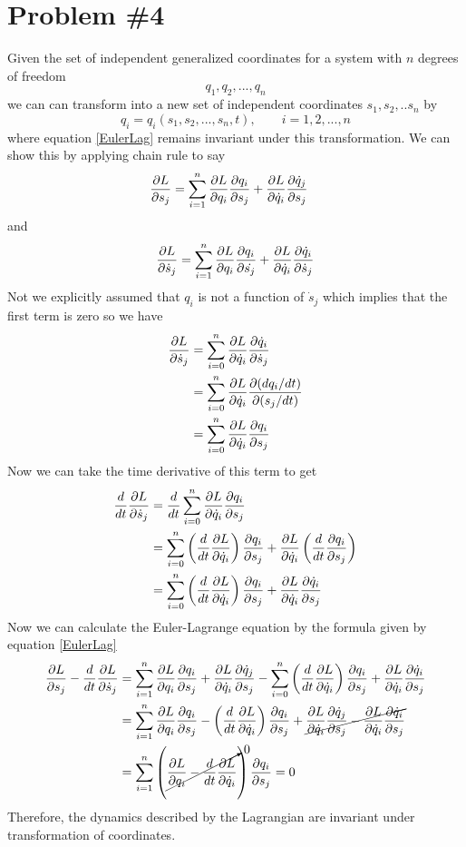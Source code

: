 \documentclass[11pt]{article}
\numberwithin{equation}{section}
\begin{document}
\pagebreak

\section{Problem \#4}
Given the set of independent generalized coordinates for a system with $n$ degrees of freedom
$$q_1,q_2,...,q_n$$
we can can transform into a new set of independent coordinates $s_1,s_2,..s_n$ by
$$q_i = q_i(s_1,s_2,...,s_n,t),\qquad i=1,2,...,n$$ 
where equation \ref{EulerLag} remains invariant under this transformation. We can show this
by applying chain rule to say
\begin{align*}
\frac{\partial{L}}{\partial{s_j}} &= \sum_{i=1}^{n}\frac{\partial{L}}{\partial{q_i}}\frac{\partial{q_i}}{\partial{s_j}}+\frac{\partial{L}}{\partial{\dot{q}_i}}\frac{\partial{\dot{q}_j}}{\partial{s_j}}
\end{align*}
and
$$\frac{\partial{L}}{\partial{\dot{s}_j}} = \sum_{i=1}^{n}\frac{\partial{L}}{\partial{q_i}}\frac{\partial{q_i}}{\partial{\dot{s_j}}} + \frac{\partial{L}}{\partial{\dot{q}_i}}\frac{\partial{\dot{q}_i}}{\partial{\dot{s}_j}}$$
Not we explicitly assumed that $q_i$ is not a function of $\dot{s}_j$ which implies that the 
first term is zero so we have
\begin{align*}
\frac{\partial{L}}{\partial{\dot{s}_j}} &= \sum_{i=0}^{n}\frac{\partial{L}}{\partial{\dot{q}_i}}\frac{\partial{\dot{q}_i}}{\partial{\dot{s}_j}}\\
&= \sum_{i=0}^{n}\frac{\partial{L}}{\partial{\dot{q}_i}}\frac{\partial{(dq_i/dt)}}{\partial{(s_j/dt)}}\\
&= \sum_{i=0}^{n}\frac{\partial{L}}{\partial{\dot{q}_i}}\frac{\partial{q_i}}{\partial{s_j}}
\end{align*}
Now we can take the time derivative of this term to get
\begin{align*}
\frac{d}{dt}\frac{\partial{L}}{\partial{\dot{s}_j}} &= \frac{d}{dt}\sum_{i=0}^{n}\frac{\partial{L}}{\partial{\dot{q}_i}}\frac{\partial{q_i}}{\partial{s_j}}\\
&= \sum_{i=0}^{n}\left(\frac{d}{dt}\frac{\partial{L}}{\partial{\dot{q}_i}}\right)\frac{\partial{q_i}}{\partial{s_j}} + \frac{\partial{L}}{\partial{\dot{q}_i}}\left(\frac{d}{dt}\frac{\partial{q_i}}{\partial{s_j}}\right)\\
&= \sum_{i=0}^{n}\left(\frac{d}{dt}\frac{\partial{L}}{\partial{\dot{q}_i}}\right)\frac{\partial{q_i}}{\partial{s_j}} + \frac{\partial{L}}{\partial{\dot{q}_i}}\frac{\partial{\dot{q}_i}}{\partial{s_j}}
\end{align*}
Now we can calculate the Euler-Lagrange equation by the formula given by equation \ref{EulerLag}
\begin{align*}
\frac{\partial{L}}{\partial{s_j}} - \frac{d}{dt}\frac{\partial{L}}{\partial{\dot{s}_j}} &= \sum_{i=1}^{n}\frac{\partial{L}}{\partial{q_i}}\frac{\partial{q_i}}{\partial{s_j}}+\frac{\partial{L}}{\partial{\dot{q}_i}}\frac{\partial{\dot{q}_j}}{\partial{s_j}} - \sum_{i=0}^{n}\left(\frac{d}{dt}\frac{\partial{L}}{\partial{\dot{q}_i}}\right)\frac{\partial{q_i}}{\partial{s_j}} + \frac{\partial{L}}{\partial{\dot{q}_i}}\frac{\partial{\dot{q}_i}}{\partial{s_j}}\\
&= \sum_{i=1}^{n}\frac{\partial{L}}{\partial{q_i}}\frac{\partial{q_i}}{\partial{s_j}} - \left(\frac{d}{dt}\frac{\partial{L}}{\partial{\dot{q}_i}}\right)\frac{\partial{q_i}}{\partial{s_j}} + \cancel{\frac{\partial{L}}{\partial{\dot{q}_i}}\frac{\partial{\dot{q}_j}}{\partial{s_j}} - \frac{\partial{L}}{\partial{\dot{q}_i}}\frac{\partial{\dot{q}_i}}{\partial{s_j}}}\\
&= \sum_{i=1}^{n}\left(\cancelto{0}{\frac{\partial{L}}{\partial{q_i}} - \frac{d}{dt}\frac{\partial{L}}{\partial{\dot{q}_i}}}\right)\frac{\partial{q_i}}{\partial{s_j}} = 0
\end{align*}
Therefore, the dynamics described by the Lagrangian are invariant under transformation of 
coordinates.
\end{document}
